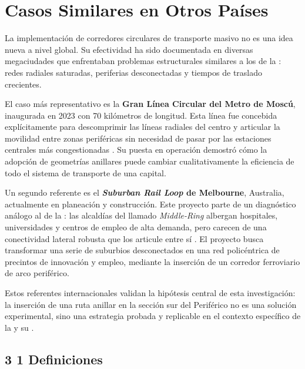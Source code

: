 \section{Casos Similares en Otros Países}
\label{sec:casos-similares}

La implementación de corredores circulares de transporte masivo no es una idea
nueva a nivel global. Su efectividad ha sido documentada en diversas megaciudades
que enfrentaban problemas estructurales similares a los de la \cdmx{}: redes
radiales saturadas, periferias desconectadas y tiempos de traslado crecientes.

El caso más representativo es la \textbf{Gran Línea Circular del Metro de Moscú},
inaugurada en 2023 con 70 kilómetros de longitud. Esta línea fue concebida
explícitamente para descomprimir las líneas radiales del centro y articular la
movilidad entre zonas periféricas sin necesidad de pasar por las estaciones
centrales más congestionadas \parencite{efe2023}. Su puesta en operación
demostró cómo la adopción de geometrías anillares puede cambiar cualitativamente
la eficiencia de todo el sistema de transporte de una capital.

Un segundo referente es el \textbf{\textit{Suburban Rail Loop} de Melbourne},
Australia, actualmente en planeación y construcción. Este proyecto parte de un
diagnóstico análogo al de la \cdmx{}: las alcaldías del llamado \textit{Middle-Ring}
albergan hospitales, universidades y centros de empleo de alta demanda, pero
carecen de una conectividad lateral robusta que los articule entre sí
\parencite{suburbanrailloop2021}. El proyecto busca transformar una serie de
suburbios desconectados en una red policéntrica de precintos de innovación y
empleo, mediante la inserción de un corredor ferroviario de arco periférico.

Estos referentes internacionales validan la hipótesis central de esta investigación:
la inserción de una ruta anillar en la sección sur del Periférico no es una solución
experimental, sino una estrategia probada y replicable en el contexto específico de
la \cdmx{} y su \zmvm{}.

\subsection*{3 1 Definiciones}

